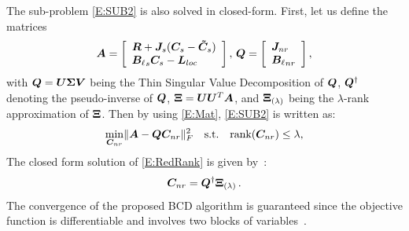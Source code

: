 The sub-problem \cref{E:SUB2} is also solved in closed-form. First, let us define the matrices
\begin{equation}\label{E:Mat}
    \boldsymbol{A}=
        \left[
            \begin{array}{l}
               \boldsymbol{R} + \boldsymbol{J}_{s} (\boldsymbol{C}_{s} - \boldsymbol{\tilde{C}}_{s}) \\
               {\boldsymbol{B}_\ell}_{s} \boldsymbol{C}_{s} - \boldsymbol{L}_{loc}
            \end{array}
        \right],\,
    \boldsymbol{Q}=
        \left[
            \begin{array}{l}
                \boldsymbol{J}_{nr} \\
                {\boldsymbol{B}_{\ell}}_{nr}
            \end{array}
        \right],
\end{equation}
with $\boldsymbol{Q} = \boldsymbol{U}\boldsymbol{\Sigma}\boldsymbol{V}$ being the 
Thin Singular Value Decomposition of $\boldsymbol{Q}$,
$\boldsymbol{Q}^{\dag}$ denoting the pseudo-inverse of $\boldsymbol{Q}$,
$\boldsymbol{\Xi} = \boldsymbol{U}\boldsymbol{U}^T\boldsymbol{A}$, and $\boldsymbol{\Xi}_{(\lambda)}$ being the 
$\lambda$-rank approximation of $\boldsymbol{\Xi}$.
Then by using \cref{E:Mat},  \cref{E:SUB2} is written as:
\begin{equation}\label{E:RedRank}
    \min_{\boldsymbol{C}_{nr}} \lVert{} \boldsymbol{A}  - \boldsymbol{Q} \boldsymbol{C}_{nr} \rVert_F^2 \quad \mbox{s.t.} \quad  \mbox{rank}(\boldsymbol{C}_{nr}) \leq \lambda,
\end{equation}
The closed form solution of \cref{E:RedRank} is given by~\cite{sondermann1986best}: 
\begin{equation}
    \boldsymbol{C}_{nr}  = \boldsymbol{Q}^{\dag}\boldsymbol{\Xi}_{(\lambda)}  \,.
\end{equation}
The convergence of the proposed BCD algorithm is guaranteed since the objective function
is differentiable and involves two blocks of variables~\cite{luo1992convergence}.
